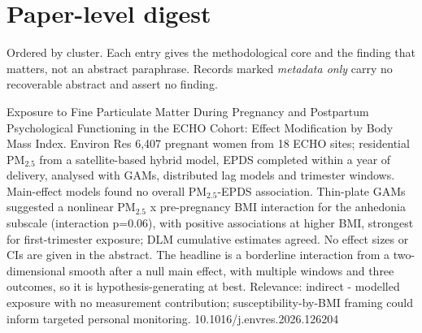 \documentclass[10pt]{article}
\begin{document}
\par{}\baselineskip{}\baselineskip
\section*{\sffamily\bfseries\color{Deep}Paper-level digest}
\vspace{-1.5mm}{\color{Amber}\rule{\linewidth}{1.1pt}}\vspace{2.5mm}

{\fontsize{7.4}{9}\selectfont\color{Slate}Ordered by cluster. Each entry gives the
methodological core and the finding that matters, not an abstract paraphrase. Records
marked \textit{metadata only} carry no recoverable abstract and assert no finding.\par}


{Exposure to Fine Particulate Matter During Pregnancy and Postpartum Psychological Functioning in the ECHO Cohort: Effect Modification by Body Mass Index.}
{Environ Res}
{6,407 pregnant women from 18 ECHO sites; residential PM$_{2.5}$ from a satellite-based hybrid model, EPDS completed within a year of delivery, analysed with GAMs, distributed lag models and trimester windows. Main-effect models found no overall PM$_{2.5}$-EPDS association. Thin-plate GAMs suggested a nonlinear PM$_{2.5}$ x pre-pregnancy BMI interaction for the anhedonia subscale (interaction p=0.06), with positive associations at higher BMI, strongest for first-trimester exposure; DLM cumulative estimates agreed. No effect sizes or CIs are given in the abstract. The headline is a borderline interaction from a two-dimensional smooth after a null main effect, with multiple windows and three outcomes, so it is hypothesis-generating at best. Relevance: indirect - modelled exposure with no measurement contribution; susceptibility-by-BMI framing could inform targeted personal monitoring.}
{10.1016/j.envres.2026.126204}

\par{}\baselineskip{}\baselineskip
{}
\end{document}
